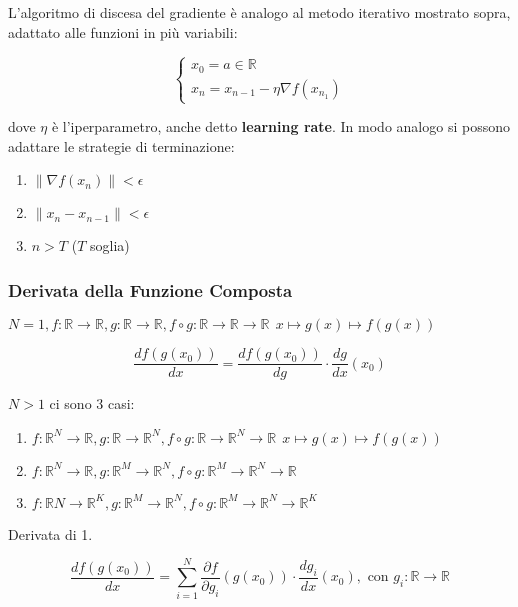 \documentclass[a4paper,12pt]{article}
\begin{document}
	\noindent L'algoritmo di discesa del gradiente è analogo al metodo iterativo mostrato sopra, adattato alle funzioni in più variabili:

	\[
	\begin{cases}
		x_0 = a \in \mathbb{R} \\
		x_n = x_{n-1} - \eta \nabla f(x_{n_1})
	\end{cases}
	\]

	dove $\eta$ è l'iperparametro, anche detto \textbf{learning rate}. In modo analogo si possono adattare le strategie di terminazione:

	\begin{enumerate}
		\item $ \| \nabla f(x_n)\| < \epsilon $
		\item $ \| x_n - x_{n-1}\| < \epsilon $
		\item $n > T$ ($T$ soglia)
	\end{enumerate}

	\subsubsection{Derivata della Funzione Composta}

	$N = 1, f : \mathbb{R} \rightarrow \mathbb{R}, g : \mathbb{R} \rightarrow \mathbb{R}, f \circ g : \mathbb{R} \rightarrow \mathbb{R} \rightarrow \mathbb{R} \ \ x \mapsto g(x) \mapsto f(g(x))$

	\[
	\frac{d f(g(x_0))}{d x} = \frac{d f(g(x_0))}{d g} \cdot \frac{d g}{d x}(x_0)
	\]

	\noindent $N > 1$ ci sono 3 casi:

	\begin{enumerate}
		\item $ f : \mathbb{R}^N \rightarrow \mathbb{R}, g : \mathbb{R} \rightarrow \mathbb{R}^N, f \circ g : \mathbb{R} \rightarrow \mathbb{R}^N \rightarrow \mathbb{R} \ \ x \mapsto g(x) \mapsto f(g(x))$
		\item $ f : \mathbb{R}^N \rightarrow \mathbb{R}, g : \mathbb{R}^M \rightarrow \mathbb{R}^N, f \circ g : \mathbb{R}^M \rightarrow \mathbb{R}^N \rightarrow \mathbb{R}$
		\item $ f : \mathbb{R}N \rightarrow \mathbb{R}^K, g : \mathbb{R}^M \rightarrow \mathbb{R}^N, f \circ g : \mathbb{R}^M \rightarrow \mathbb{R}^N \rightarrow \mathbb{R}^K$
	\end{enumerate}

	Derivata di 1.

	\[
	\frac{df(g(x_0))}{dx} = \sum_{i = 1}^{N} \frac{\partial f}{\partial g_i} (g(x_0)) \cdot \frac{dg_i}{dx} (x_0), \text{ con } g_i : \mathbb{R} \rightarrow \mathbb{R}
	\]
\end{document}
